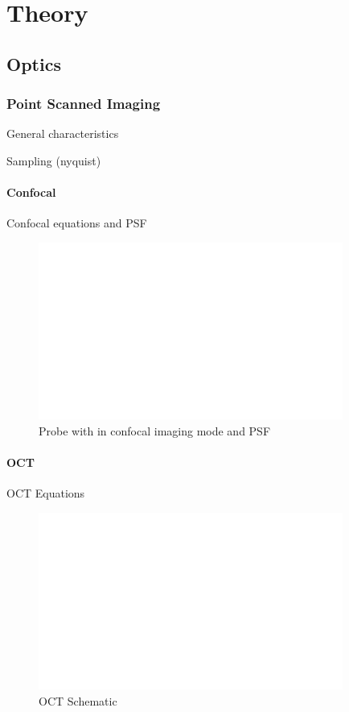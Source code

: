 %
%
\chapter{Theory}
\label{Ch:Theory}	

\section{Optics}

\subsection{Point Scanned Imaging}
General characteristics

Sampling (nyquist)

\subsubsection{Confocal}

Confocal equations and PSF

\begin{figure}[h!]\centering \includegraphics[width=10cm,draft]{figures/foo.png}
      \caption{Probe with in confocal imaging mode and PSF}
\end{figure}


\subsubsection{OCT}
OCT Equations

\begin{figure}[h!]\centering \includegraphics[width=10cm,draft]{figures/foo.png}
      \caption{OCT Schematic}
\end{figure}


